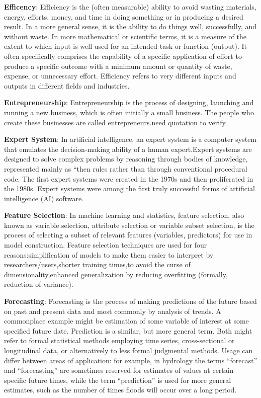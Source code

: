 \documentclass[]{book}
\theoremstyle{definition}
\theoremstyle{definition}
\theoremstyle{definition}
\theoremstyle{remark}
\begin{document}
\textbf{Efficency}: Efficiency is the (often measurable) ability to
avoid wasting materials, energy, efforts, money, and time in doing
something or in producing a desired result. In a more general sense, it
is the ability to do things well, successfully, and without waste. In
more mathematical or scientific terms, it is a measure of the extent to
which input is well used for an intended task or function (output). It
often specifically comprises the capability of a specific application of
effort to produce a specific outcome with a minimum amount or quantity
of waste, expense, or unnecessary effort. Efficiency refers to very
different inputs and outputs in different fields and industries.

\textbf{Entrepreneurship}: Entrepreneurship is the process of designing,
launching and running a new business, which is often initially a small
business. The people who create these businesses are called
entrepreneurs.need quotation to verify.

\textbf{Expert System}: In artificial intelligence, an expert system is
a computer system that emulates the decision-making ability of a human
expert.Expert systems are designed to solve complex problems by
reasoning through bodies of knowledge, represented mainly as ``then
rules rather than through conventional procedural code. The first expert
systems were created in the 1970s and then proliferated in the 1980s.
Expert systems were among the first truly successful forms of artificial
intelligence (AI) software.

\textbf{Feature Selection}: In machine learning and statistics, feature
selection, also known as variable selection, attribute selection or
variable subset selection, is the process of selecting a subset of
relevant features (variables, predictors) for use in model construction.
Feature selection techniques are used for four reasons:simplification of
models to make them easier to interpret by researchers/users,shorter
training times,to avoid the curse of dimensionality,enhanced
generalization by reducing overfitting (formally, reduction of
variance).

\textbf{Forecasting}: Forecasting is the process of making predictions
of the future based on past and present data and most commonly by
analysis of trends. A commonplace example might be estimation of some
variable of interest at some specified future date. Prediction is a
similar, but more general term. Both might refer to formal statistical
methods employing time series, cross-sectional or longitudinal data, or
alternatively to less formal judgmental methods. Usage can differ
between areas of application: for example, in hydrology the terms
``forecast'' and ``forecasting'' are sometimes reserved for estimates of
values at certain specific future times, while the term ``prediction''
is used for more general estimates, such as the number of times floods
will occur over a long period.
\end{document}
